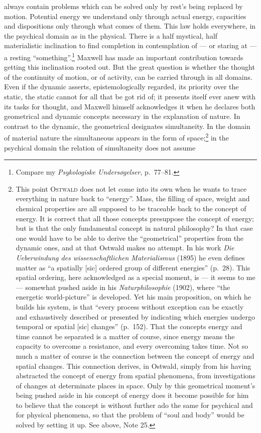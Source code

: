 \documentclass[12pt,a4paper]{book}
\begin{document}
always contain problems which can be solved only by rest's being replaced by
motion. Potential energy we understand only through actual energy, capacities
and dispositions only through what comes of them. This law holds everywhere, in
the psychical domain as in the physical. There is a half mystical, half
materialistic inclination to find completion in contemplation of --- or staring
at --- a resting ``something''.\footnote{Compare my \textit{Psykologiske
Undersøgelser}, p.~77--81.} Maxwell has made an important contribution towards
getting this inclination rooted out. But the great question is whether the
thought of the continuity of motion, or of activity, can be carried through in
all domains. Even if the dynamic asserts, epistemologically regarded, its
priority over the static, the static cannot for all that be got rid of; it
presents itself ever anew with its tasks for thought, and Maxwell himself
acknowledges it when he declares both geometrical and dynamic concepts necessary
in the explanation of nature. In contrast to the dynamic, the geometrical
designates simultaneity. In the domain of material nature the simultaneous
appears in the form of space;\footnote{This point \textsc{Ostwald} does not let
come into its own when he wants to trace everything in nature back to
``energy''. Mass, the filling of space, weight and chemical properties are all
supposed to be traceable back to the concept of energy. It is correct that all
those concepts presuppose the concept of energy; but is that the only
fundamental concept in natural philosophy? In that case one would have to be
able to derive the ``geometrical'' properties from the dynamic ones, and at that
Ostwald makes no attempt. In his work \textit{Die Ueberwindung des
wissenschaftlichen Materialismus} (1895) he even defines matter as ``a spatially
[sic] ordered group of different energies'' (p.~28). This spatial ordering, here
acknowledged as a special moment, is --- it seems to me --- somewhat pushed
aside in his \textit{Naturphilosophie} (1902), where ``the energetic
world-picture'' is developed. Yet his main proposition, on which he builds his
system, is that ``every process without exception can be exactly and
exhaustively described or presented by indicating which energies undergo
temporal or spatial [sic] changes'' (p.~152). That the concepts energy and time
cannot be separated is a matter of course, since energy means the capacity to
overcome a resistance, and every overcoming takes time. Not so much a matter of
course is the connection between the concept of energy and spatial changes. This
connection derives, in Ostwald, simply from his having abstracted the concept of
energy from spatial phenomena, from investigations of changes at determinate
places in space. Only by this geometrical moment's being pushed aside in his
concept of energy does it become possible for him to believe that the concept is
without further ado the same for psychical and for physical phenomena, so that
the problem of ``soul and body'' would be solved by setting it up. See above,
Note 25.} in the psychical domain the relation of simultaneity does not assume
\end{document}
